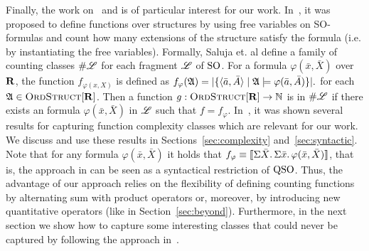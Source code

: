 Finally, the work on~\cite{SalujaST95} and \cite{compton1996logical} is of particular interest for our work. 
In~\cite{SalujaST95}, it was proposed to define functions over structures by using free variables on SO-formulas and count how many extensions of the structure satisfy the formula (i.e. by instantiating the free variables). 
Formally, Saluja et. al \cite{SalujaST95} define a family of counting classes $\#\mathscr{L}$ for each fragment $\mathscr{L}$ of ${\rm SO}$. For a formula $\varphi(\bar{x},\bar{X})$ over $\mathbf{R}$, the function $f_{\varphi(x,X)}$ is defined as
$
f_{\varphi}(\mathfrak{A}) = \vert \{\langle \bar{a},\bar{A} \rangle\mid \mathfrak{A}\models\varphi(\bar{a},\bar{A})\}\vert.
$
for each $\mathfrak{A}\in\text{\sc OrdStruct}[\mathbf{R}]$. Then a function $g:\text{\sc OrdStruct}[\mathbf{R}]\to\mathbb{N}$ is in $\#\mathscr{L}$ if there exists an formula $\varphi(\bar{x},\bar{X})$ in $\mathscr{L}$ such that $f = f_{\varphi}$. 
In~\cite{SalujaST95}, it was shown several results for capturing function complexity classes which are relevant for our work. We discuss and use these results in Sections~\ref{sec:complexity} and~\ref{sec:syntactic}.
Note that for any formula $\varphi(\bar{x},\bar{X})$ it holds that $f_\varphi \equiv {\llbracket{}{\Sigma{\bar{X}}.\, \Sigma{\bar{x}}.\, \varphi(\bar{x},\bar{X})}\rrbracket}$, that is, the approach in \cite{SalujaST95} can be seen as a syntactical restriction of ${\rm QSO}$. 
Thus, the advantage of our approach relies on the flexibility of defining  counting functions by alternating sum with product operators or, moreover, by introducing new quantitative operators (like in Section~\ref{sec:beyond}).
Furthermore, in the next section we show how to capture some interesting classes that could never be captured by following the approach in~\cite{SalujaST95}.
